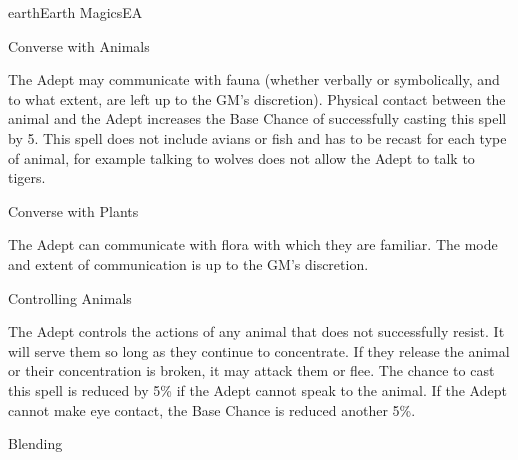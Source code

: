\begin{College}[1.2]{earth}{Earth Magics}{EA}
\begin{spell}[G-1]{Converse with Animals}

\begin{effects}
The Adept may communicate with fauna (whether verbally or
symbolically, and to what extent, are left up to the GM’s discretion).
Physical contact between the animal and the Adept increases the Base
Chance of successfully casting this spell by 5.  This spell does not
include avians or fish and has to be recast for each type of animal,
for example talking to wolves does not allow the Adept to talk to
tigers.

\end{effects}
\end{spell}

\begin{spell}[G-2]{Converse with Plants}

\begin{effects}
The Adept can communicate with flora with which they are familiar. The
mode and extent of communication is up to the GM’s discretion.

\end{effects}
\end{spell}

\begin{spell}[G-3]{Controlling Animals}

\begin{effects}
The Adept controls the actions of any animal that does not
successfully resist.  It will serve them so long as they continue to
concentrate.  If they release the animal or their concentration is
broken, it may attack them or flee.  The chance to cast this spell is
reduced by 5\% if the Adept cannot speak to the animal. If the Adept
cannot make eye contact, the Base Chance is reduced another 5\%.

\end{effects}
\end{spell}

\begin{spell}[G-4]{Blending}


\end{spell}
\end{College}
